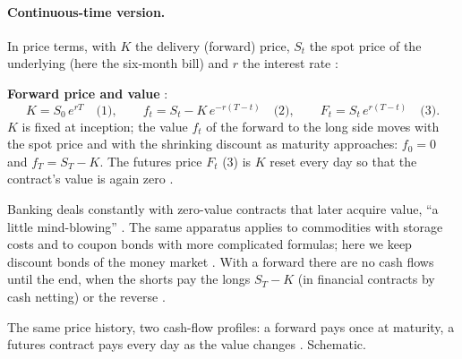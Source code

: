 \begin{paracol}{2}
\paragraph{Continuous-time version.} In price terms, with $K$ the delivery (forward) price, $S_t$ the spot price of the underlying (here the six-month bill) and $r$
the interest rate :
\begin{keyformulas}
\textbf{Forward price and value} :
\[
  K = S_0\,e^{rT} \quad\text{(1)}, \qquad f_t = S_t - K\,e^{-r(T-t)} \quad\text{(2)}, \qquad F_t = S_t\,e^{r(T-t)} \quad\text{(3)}.
\]
$K$ is fixed at inception; the value $f_t$ of the forward to the long side moves with the spot price and with the shrinking discount as maturity approaches:
$f_0=0$ and $f_T = S_T - K$. The futures price $F_t$ (3) is $K$ reset every day so that the contract's value is again zero .
\end{keyformulas}

Banking deals constantly with zero-value contracts that later acquire value, ``a little mind-blowing'' . The
same apparatus applies to commodities with storage costs and to coupon bonds with more complicated formulas; here we keep discount bonds of the money market
. With a forward there are no cash flows until the end, when the shorts pay the longs $S_T-K$ (in financial
contracts by cash netting) or the reverse .

\begin{nfigure}
\caption{The same price history, two cash-flow profiles: a forward pays once at maturity, a futures contract pays every day as the value changes
. Schematic.}\label{fig:ff-paths}
\end{nfigure}


\end{paracol}
